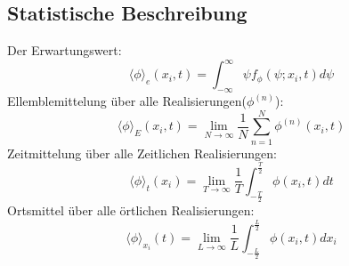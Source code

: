 \subsection{Statistische Beschreibung}
Der Erwartungswert:
\begin{equation}
	\langle\phi\rangle_{e}\left(x_{i}, t\right)=\int_{-\infty}^{\infty} \psi f_{\phi}\left(\psi ; x_{i}, t\right) d \psi
\end{equation}
Ellemblemittelung über alle Realisierungen($\phi^{(n)}$):
\begin{equation}
	\langle\phi\rangle_{E}\left(x_{i}, t\right)=\lim _{N \rightarrow \infty} \frac{1}{N} \sum_{n=1}^{N} \phi^{(n)}\left(x_{i}, t\right)
\end{equation}
Zeitmittelung über alle Zeitlichen Realisierungen:
\begin{equation}
	\langle\phi\rangle_{t}\left(x_{i}\right)=\lim _{T \rightarrow \infty} \frac{1}{T} \int^{\frac{T}{2}}_{-\frac{T}{2}} \phi\left(x_{i}, t\right) d t
\end{equation}
Ortsmittel über alle örtlichen Realisierungen:
\begin{equation}
	\langle\phi\rangle_{x_{i}}(t)=\lim _{L \rightarrow \infty} \frac{1}{L} \int_{-\frac{L}{2}}^{\frac{L}{2}} \phi\left(x_{i}, t\right) d x_{i}
\end{equation}